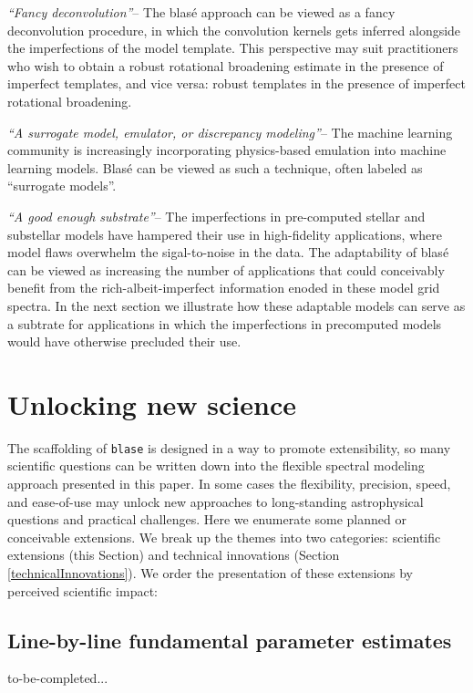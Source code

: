 \documentclass[twocolumn]{aastex631}
\begin{document}
\emph{``Fancy deconvolution''}-- The blas\'e approach can be viewed as a fancy deconvolution procedure, in which the convolution kernels gets inferred alongside the imperfections of the model template.  This perspective may suit practitioners who wish to obtain a robust rotational broadening estimate in the presence of imperfect templates, and vice versa: robust templates in the presence of imperfect rotational broadening.

\emph{``A surrogate model, emulator, or discrepancy modeling''}-- The machine learning community is increasingly incorporating physics-based emulation into machine learning models.  Blas\'e can be viewed as such a technique, often labeled as ``surrogate models''.  


\emph{``A good enough substrate''}-- The imperfections in pre-computed stellar and substellar models have hampered their use in high-fidelity applications, where model flaws overwhelm the sigal-to-noise in the data.  The adaptability of blas\'e can be viewed as increasing the number of applications that could conceivably benefit from the rich-albeit-imperfect information enoded in these model grid spectra.  In the next section we illustrate how these adaptable models can serve as a subtrate for applications in which the imperfections in precomputed models would have otherwise precluded their use.

\section{Unlocking new science}\label{secFutureWork}

The scaffolding of \texttt{blase} is designed in a way to promote extensibility, so many scientific questions can be written down into the flexible spectral modeling approach presented in this paper.  In some cases the flexibility, precision, speed, and ease-of-use may unlock new approaches to long-standing astrophysical questions and practical challenges. Here we enumerate some planned or conceivable extensions.  We break up the themes into two categories: scientific extensions (this Section) and technical innovations (Section \ref{technicalInnovations}).  We order the presentation of these extensions by perceived scientific impact:

\subsection{Line-by-line fundamental parameter estimates}
to-be-completed...
\end{document}
